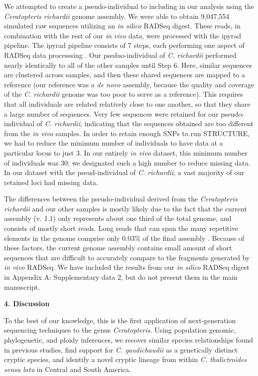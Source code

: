 \documentclass[12pt]{article}
\begin{document}
\begin{flushleft}
We attempted to create a pseudo-individual to including in our analysis using the \textit{Ceratopteris richardii} genome assembly. We were able to obtain 9,047,554 simulated raw sequences utilizing an \textit{in silico} RADSeq digest. These reads, in combination with the rest of our \textit{in vivo} data, were processed with the ipyrad pipeline. The ipyrad pipeline consists of 7 steps, each performing one aspect of RADSeq data processsing \autocite{Eaton2020}. Our pseduo-individual of \textit{C. richardii} performed nearly identically to all of the other samples until Step 6. Here, similar sequences are clustered across samples, and then these shared sequences are mapped to a reference (our reference was a \textit{de novo} assembly, because the quality and coverage of the \textit{C. richardii} genome was too poor to serve as a reference). This requires that all individuals are related relatively close to one another, so that they share a large number of sequences. Very few sequences were retained for our pseudo-individual of \textit{C. richardii}, indicating that the sequences obtained are too different from the \textit{in vivo} samples. In order to retain enough SNPs to run STRUCTURE, we had to reduce the minimum number of individuals to have data at a particular locus to just 3. In our entirely \textit{in vivo} dataset, this minimum number of individuals was 30; we designated such a high number to reduce missing data. In our dataset with the pseud-individual of \textit{C. richardii}, a vast majority of our retained loci had missing data.

The differences between the pseudo-individual derived from the \textit{Ceratopteris richardii} and our other samples is mostly likely due to the fact that the current assembly (v. 1.1) only represents about one third of the total genome, and consists of mostly short reads. Long reads that can span the many repetitive elements in the genome comprise only 0.03\% of the final assembly \autocite{Marchant2019}. Because of these factors, the current genome assembly contains small amount of short sequences that are difficult to accurately compare to the fragments generated by \textit{in vivo} RADSeq. We have included the results from our \textit{in silico} RADSeq digest in Appendix A: Supplementary data 2, but do not present them in the main manuscript.

\vspace{1cm}

{\large\textbf{4. Discussion}}

To the best of our knowledge, this is the first application of next-generation sequencing techniques to the genus \textit{Ceratopteris}. Using population genomic, phylogenetic, and ploidy inferences, we recover similar species relationships found in previous studies, find support for \textit{C. gaudichaudii} as a genetically distinct cryptic species, and identify a novel cryptic lineage from within \textit{C. thalictroides} \textit{sensu latu} in Central and South America.


\end{flushleft}
\end{document}

